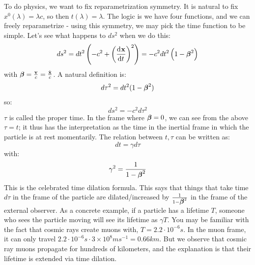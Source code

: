 To do physics, we want to fix reparametrization symmetry. It is natural to fix $x^0(\lambda) = \lambda c$, so then $t(\lambda) = \lambda$. The logic is we have four functions, and we can freely reparametrize - using this symmetry, we may pick the time function to be simple. Let's see what happens to $ds^2$ when we do this:
\begin{equation}
    ds^2 = dt^2\left(-c^2 + \left(\dod{\v{x}}{t}\right)^2\right) = -c^2dt^2\left(1 - \gv{\beta}^2\right)
\end{equation}
with $\mbox{\boldmath$ \beta $} = \frac{\mathbf{v}}{c} = \frac{\dot{\mathbf{x}}}{c}$. A natural definition is:
\begin{equation}
    d\tau^2 = dt^2(1 - \mbox{\boldmath$ \beta $}^2)
\end{equation}
so:
\begin{equation}
    ds^2 = -c^2d\tau^2
\end{equation}
$\tau$ is called the proper time. In the frame where $\mbox{\boldmath$ \beta $} = 0$, we can see from the above $\tau = t$; it thus has the interpretation as the time in the inertial frame in which the particle is at rest momentarily. The relation between $t, \tau$ can be written as:
\begin{equation}
    dt = \gamma d\tau
\end{equation}
with:
\begin{equation}
    \gamma^2 = \frac{1}{1 - \mbox{\boldmath$ \beta $}^2}
\end{equation}
This is the celebrated time dilation formula. This says that things that take time $d\tau$ in the frame of the particle are dilated/increased by $\frac{1}{1-\mbox{\boldmath$ \beta $}^2}$ in the frame of the external observer. As a concrete example, if a particle has a lifetime $T$, someone who sees the particle moving will see its lifetime as $\gamma T$. You may be familiar with the fact that cosmic rays create muons with, $T = 2.2 \cdot 10^{-6}\si{s}$. In the muon frame, it can only travel $2. 2 \cdot 10^{-6}\si{s} \cdot 3 \times 10^{8}\si{ms^{-1}} = 0.66\si{km}$. But we observe that cosmic ray muons propagate for hundreds of kilometers, and the explanation is that their lifetime is extended via time dilation.

